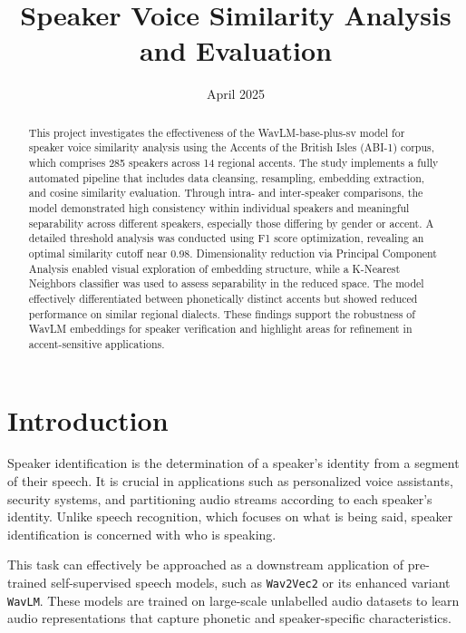 \documentclass[conference]{IEEEtran}
\begin{document}
	
\title{Speaker Voice Similarity Analysis and Evaluation}

	
\author{
	\date{April 2025}
	
}

\maketitle

\begin{abstract}
	This project investigates the effectiveness of the WavLM-base-plus-sv model for speaker voice similarity analysis using the Accents of the British Isles (ABI-1) corpus, which comprises 285 speakers across 14 regional accents. The study implements a fully automated pipeline that includes data cleansing, resampling, embedding extraction, and cosine similarity evaluation. Through intra- and inter-speaker comparisons, the model demonstrated high consistency within individual speakers and meaningful separability across different speakers, especially those differing by gender or accent. A detailed threshold analysis was conducted using F1 score optimization, revealing an optimal similarity cutoff near 0.98. Dimensionality reduction via Principal Component Analysis enabled visual exploration of embedding structure, while a K-Nearest Neighbors classifier was used to assess separability in the reduced space. The model effectively differentiated between phonetically distinct accents but showed reduced performance on similar regional dialects. These findings support the robustness of WavLM embeddings for speaker verification and highlight areas for refinement in accent-sensitive applications.
\end{abstract}




\section{Introduction}

Speaker identification is the determination of a speaker's identity from a segment of their speech. It is crucial in applications such as personalized voice assistants, security systems, and partitioning audio streams according to each speaker's identity. Unlike speech recognition, which focuses on what is being said, speaker identification is concerned with who is speaking.

This task can effectively be approached as a downstream application of pre-trained self-supervised speech models, such as \texttt{Wav2Vec2}\cite{baevski2020wav2vec} or its enhanced variant \texttt{WavLM}\cite{chen2022wavlm}. These models are trained on large-scale unlabelled audio datasets to learn audio representations that capture phonetic and speaker-specific characteristics.
\end{document}
